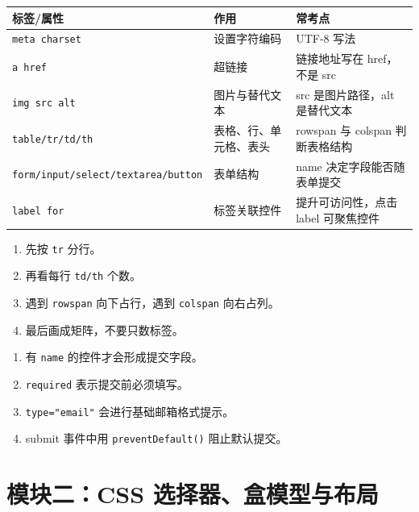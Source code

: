 \documentclass[UTF8,zihao=-4]{ctexart}
\begin{document}
\begin{longtable}{p{}p{}p{}}
\toprule
\textbf{标签/属性} & \textbf{作用} & \textbf{常考点} \\
\midrule
\texttt{meta charset} & 设置字符编码 & UTF-8 写法 \\
\texttt{a href} & 超链接 & 链接地址写在 href，不是 src \\
\texttt{img src alt} & 图片与替代文本 & src 是图片路径，alt 是替代文本 \\
\texttt{table/tr/td/th} & 表格、行、单元格、表头 & rowspan 与 colspan 判断表格结构 \\
\texttt{form/input/select/textarea/button} & 表单结构 & name 决定字段能否随表单提交 \\
\texttt{label for} & 标签关联控件 & 提升可访问性，点击 label 可聚焦控件 \\
\bottomrule
\end{longtable}

\begin{methodbox}[表格阅读题模板]
\begin{enumerate}
  \item 先按 \texttt{tr} 分行。
  \item 再看每行 \texttt{td/th} 个数。
  \item 遇到 \texttt{rowspan} 向下占行，遇到 \texttt{colspan} 向右占列。
  \item 最后画成矩阵，不要只数标签。
\end{enumerate}
\end{methodbox}

\begin{methodbox}[表单提交题模板]
\begin{enumerate}
  \item 有 \texttt{name} 的控件才会形成提交字段。
  \item \texttt{required} 表示提交前必须填写。
  \item \texttt{type="email"} 会进行基础邮箱格式提示。
  \item submit 事件中用 \texttt{preventDefault()} 阻止默认提交。
\end{enumerate}
\end{methodbox}

\section{模块二：CSS 选择器、盒模型与布局}
\end{document}
